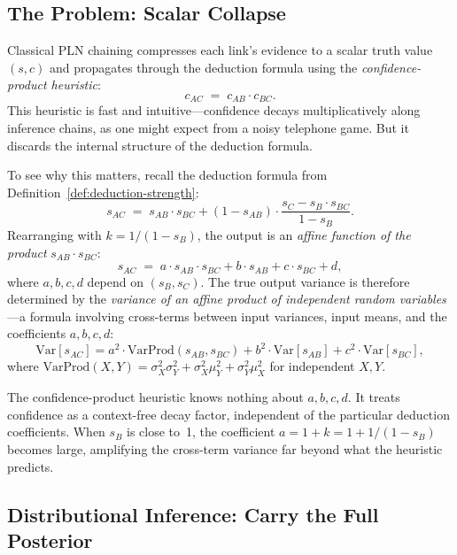 \documentclass[11pt,openany]{report}
\begin{document}
\subsection*{The Problem: Scalar Collapse}

Classical PLN chaining compresses each link's evidence to a scalar truth
value $(s, c)$ and propagates through the deduction formula using the
\emph{confidence-product heuristic}:
\[
  c_{AC} \;=\; c_{AB} \cdot c_{BC}.
\]
This heuristic is fast and intuitive---confidence decays multiplicatively
along inference chains, as one might expect from a noisy telephone game.
But it discards the internal structure of the deduction formula.

To see why this matters, recall the deduction formula from
Definition~\ref{def:deduction-strength}:
\[
  s_{AC} \;=\; s_{AB} \cdot s_{BC}
    + (1 - s_{AB}) \cdot \frac{s_C - s_B \cdot s_{BC}}{1 - s_B}.
\]
Rearranging with $k = 1/(1-s_B)$, the output is an \emph{affine function
of the product} $s_{AB} \cdot s_{BC}$:
\begin{equation}
\label{eq:deduction-affine}
  s_{AC} \;=\; a \cdot s_{AB} \cdot s_{BC}
    + b \cdot s_{AB} + c \cdot s_{BC} + d,
\end{equation}
where $a, b, c, d$ depend on $(s_B, s_C)$.  The true output variance is
therefore determined by the \emph{variance of an affine product of
independent random variables}---a formula involving cross-terms between
input variances, input means, and the coefficients $a, b, c, d$:
\begin{equation}
\label{eq:true-variance}
  \mathrm{Var}[s_{AC}]
    = a^2 \cdot \mathrm{VarProd}(s_{AB}, s_{BC})
      + b^2 \cdot \mathrm{Var}[s_{AB}]
      + c^2 \cdot \mathrm{Var}[s_{BC}],
\end{equation}
where $\mathrm{VarProd}(X, Y)
  = \sigma_X^2 \sigma_Y^2
    + \sigma_X^2 \mu_Y^2
    + \sigma_Y^2 \mu_X^2$
for independent $X, Y$.

The confidence-product heuristic knows nothing about $a, b, c, d$.  It
treats confidence as a context-free decay factor, independent of the
particular deduction coefficients.  When $s_B$ is close to~1, the
coefficient $a = 1 + k = 1 + 1/(1-s_B)$ becomes large, amplifying the
cross-term variance far beyond what the heuristic predicts.

\subsection*{Distributional Inference: Carry the Full Posterior}
\end{document}
